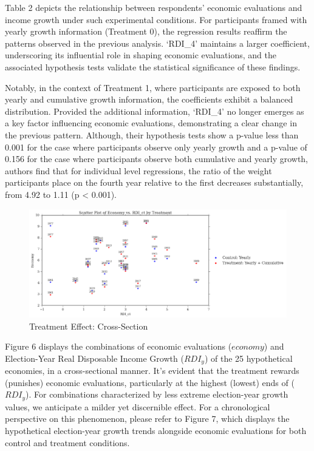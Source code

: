\documentclass[
]{article}
\begin{document}
\begin{center}
  
\end{center}

Table 2 depicts the relationship between respondents' economic
evaluations and income growth under such experimental conditions. For
participants framed with yearly growth information (Treatment 0), the
regression results reaffirm the patterns observed in the previous
analysis. `RDI\_4' maintains a larger coefficient, underscoring its
influential role in shaping economic evaluations, and the associated
hypothesis tests validate the statistical significance of these
findings.

Notably, in the context of Treatment 1, where participants are exposed
to both yearly and cumulative growth information, the coefficients
exhibit a balanced distribution. Provided the additional information,
`RDI\_4' no longer emerges as a key factor influencing economic
evaluations, demonstrating a clear change in the previous pattern.
Although, their hypothesis tests show a p-value less than 0.001 for the
case where participants observe only yearly growth and a p-value of
0.156 for the case where participants observe both cumulative and yearly
growth, authors find that for individual level regressions, the ratio of
the weight participants place on the fourth year relative to the first
decreases substantially, from 4.92 to 1.11 (p \textless{} 0.001).

\begin{figure}
\hypertarget{fig:label}{%
\centering
\includegraphics[width=1\textwidth,height=1\textheight]{difcuma.png}
\caption{Treatment Effect: Cross-Section}\label{fig:label}
}
\end{figure}

Figure 6 displays the combinations of economic evaluations (\(economy\))
and Election-Year Real Disposable Income Growth (\(RDI_y\)) of the 25
hypothetical economies, in a cross-sectional manner. It's evident that
the treatment rewards (punishes) economic evaluations, particularly at
the highest (lowest) ends of (\(RDI_y\)). For combinations characterized
by less extreme election-year growth values, we anticipate a milder yet
discernible effect. For a chronological perspective on this phenomenon,
please refer to Figure 7, which displays the hypothetical election-year
growth trends alongside economic evaluations for both control and
treatment conditions.
\end{document}
